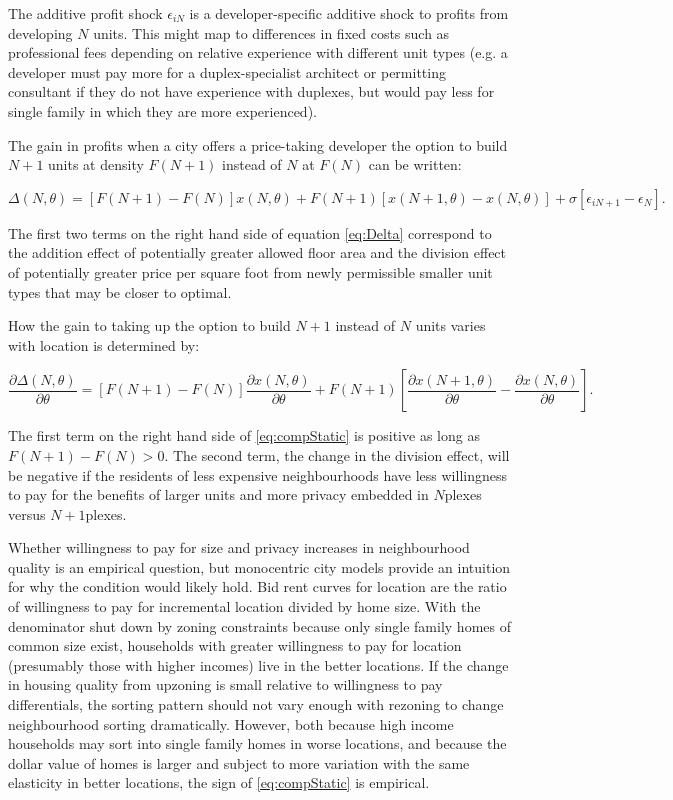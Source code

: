 \documentclass[12pt]{article}
\begin{document}
The additive profit shock $\epsilon_{iN}$ is a developer-specific
additive shock to profits from developing $N$ units. This might map to
differences in fixed costs such as professional fees depending on relative
experience with different unit types (e.g. a developer must pay more for a
duplex-specialist architect or permitting consultant if they do not have
experience with duplexes, but would pay less for single family in which they
are more experienced).

The gain in profits when a city offers a price-taking developer the option to build $N+1$ units at density $F(N+1)$ instead of $N$ at $F(N)$ can be written: 

\begin{equation}
	\label{eq:Delta}
	\Delta(N,\theta) = \left[F(N+1)-F(N)\right]x(N,\theta) + F(N+1)\left[x(N+1,\theta)-x(N,\theta)\right] + \sigma\left[\epsilon_{iN+1}-\epsilon_{N}\right].
\end{equation}

The first two terms on the right hand side of equation \eqref{eq:Delta}
correspond to the addition effect of potentially greater
allowed floor area and the division effect of potentially greater price per
square foot from newly permissible smaller unit types that may be closer to
optimal.

How the gain to taking up the option to build $N+1$ instead of $N$ units varies with location is determined by: 

\begin{equation}
	\label{eq:compStatic}
	\frac{\partial \Delta(N,\theta)}{\partial \theta} = \left[F(N+1)-F(N)\right]\frac{\partial x(N,\theta)}{\partial \theta} + F(N+1)\left[\frac{\partial x(N+1,\theta)}{\partial \theta}-\frac{\partial x(N,\theta)}{\partial \theta}\right].
\end{equation}

The first term on the right hand side of \eqref{eq:compStatic} is positive as
long as $F(N+1)-F(N)>0$. The second term, the change in the division effect,
will be negative if the residents of less expensive neighbourhoods have less
willingness to pay for the benefits of larger units and more privacy embedded
in $N$plexes versus $N+1$plexes.

Whether willingness to pay for size and privacy increases in neighbourhood
quality is an empirical question, but monocentric city models provide an
intuition for why the condition would likely hold. Bid rent curves for location
are the ratio of willingness to pay for incremental location divided by
home size. With the denominator shut down by zoning constraints because only
single family homes of common size exist, households with greater willingness
to pay for location (presumably those with higher incomes) live in the better
locations. If the change in housing quality from upzoning is small relative to
willingness to pay differentials, the sorting pattern should not vary enough
with rezoning to change neighbourhood sorting dramatically. However, both
because high income households may sort into single family homes in worse
locations, and because the dollar value of homes is larger and subject to more
variation with the same elasticity in better locations, the sign of
\eqref{eq:compStatic} is empirical. 
\end{document}
